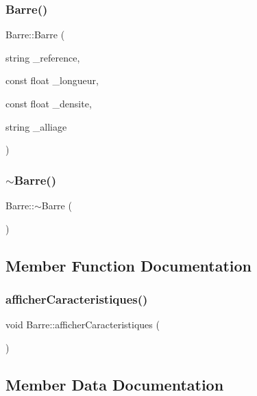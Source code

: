 \subsubsection{\texorpdfstring{Barre()}{Barre()}}
{\footnotesize\ttfamily Barre\+::\+Barre (\begin{DoxyParamCaption}\item[{string}]{\+\_\+reference,  }\item[{const float}]{\+\_\+longueur,  }\item[{const float}]{\+\_\+densite,  }\item[{string}]{\+\_\+alliage }\end{DoxyParamCaption})}

\mbox{\label{class_barre_adc603c73952d56885cad1cc1acad578f}} 
\subsubsection{\texorpdfstring{$\sim$\+Barre()}{~Barre()}}
{\footnotesize\ttfamily Barre\+::$\sim$\+Barre (\begin{DoxyParamCaption}{ }\end{DoxyParamCaption})}



\subsection{Member Function Documentation}
\mbox{\label{class_barre_a015f96c966396c30e6ba46d57dc4eb86}} 
\subsubsection{\texorpdfstring{afficher\+Caracteristiques()}{afficherCaracteristiques()}}
{\footnotesize\ttfamily void Barre\+::afficher\+Caracteristiques (\begin{DoxyParamCaption}{ }\end{DoxyParamCaption})}



\subsection{Member Data Documentation}
\mbox{\label{class_barre_a563afd4a7499371c8ad33ac807fc4dbf}} 
